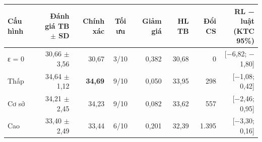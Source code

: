 \begin{tabular}{lrrcrrrr}
\toprule
Cấu hình & \makecell[r]{Đánh giá TB\\\(\pm\) SD} & Chính xác & Tối ưu & Giảm giá & HL TB & Đổi CS & \makecell[r]{RL − luật\\(KTC 95\%)} \\
\midrule
ε = 0 & 30{,}66 $\pm$ 3{,}56 & 30{,}67 & 3/10 & 0{,}382 & 30{,}68 & 0 & [\ensuremath{-}6{,}82; \ensuremath{-}1{,}80] \\
Thấp & 34{,}64 $\pm$ 1{,}12 & \textbf{34{,}69} & 9/10 & 0{,}050 & 33{,}95 & 298 & [\ensuremath{-}1{,}08; 0{,}42] \\
Cơ sở & 34{,}21 $\pm$ 2{,}45 & 34{,}23 & 9/10 & 0{,}082 & 33{,}62 & 557 & [\ensuremath{-}2{,}46; 0{,}95] \\
Cao & 33{,}40 $\pm$ 2{,}49 & 33{,}44 & 6/10 & 0{,}201 & 32{,}39 & 1{.}395 & [\ensuremath{-}3{,}30; 0{,}16] \\
\bottomrule
\end{tabular}
